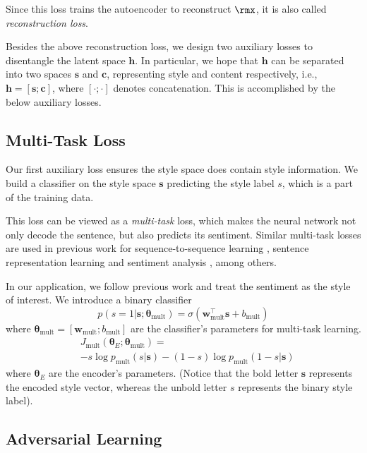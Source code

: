 Since this loss trains the autoencoder to reconstruct $\rmx$, it is also called \textit{reconstruction loss}.

Besides the above reconstruction loss, we design two auxiliary losses to disentangle the latent space $\bm h$. In particular, we hope that $\bm h$ can be separated into two spaces $\bm s$ and $\bm c$, representing style and content respectively, i.e., $\bm h = [\bm s ; \bm c]$, where $[\cdot;\cdot]$ denotes concatenation. This is accomplished by the below auxiliary losses.

\subsection{Multi-Task Loss} \label{ss:multi}

Our first auxiliary loss ensures the style space does contain style information. We build a classifier on the style space $\bm s$ predicting the style label $s$, which is a part of the training data.

This loss can be viewed as a \textit{multi-task} loss, which makes the neural network not only decode the sentence, but also predicts its sentiment. Similar multi-task losses are used in previous work for sequence-to-sequence learning \cite{luong2015multi}, sentence representation learning \cite{jernite2017discourse} and sentiment analysis \cite{balikas2017multitask}, among others.

In our application, we follow previous work \cite{hu2017toward,shen2017style,fu2017style} and treat the sentiment as the style of interest. We introduce a binary classifier
\begin{equation}
	p(s=1|\bm s;\bm\theta_\text{mult})=\sigma(\bm w_\text{mult}^\top \bm s + b_\text{mult})
\end{equation}
where $\bm\theta_\text{mult}=[\bm w_\text{mult}; b_\text{mult}]$ are the classifier's parameters for multi-task learning.
\begin{align} \label{eqn:Jmult}
	 & J_\text{mult}(\bm\theta_{E};\bm\theta_\text{mult})=                \\ \nonumber
	 & -s\log p_\text{mult}(s|\bm s) - (1-s)\log p_\text{mult}(1-s|\bm s)
\end{align}
where $\bm\theta_E$ are the encoder's parameters. (Notice that the bold letter $\bm s$ represents the encoded style vector, whereas the unbold letter $s$ represents the binary style label).


\subsection{Adversarial Learning} \label{ss:adv}

